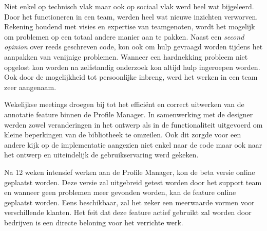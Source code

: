 Niet enkel op technisch vlak maar ook op sociaal vlak werd heel wat bijgeleerd. Door het functioneren in een team, werden heel wat nieuwe inzichten verworven. Rekening houdend met visies en expertise van teamgenoten, wordt het mogelijk om problemen op een totaal andere manier aan te pakken. Naast een \textit{second opinion} over reeds geschreven code, kon ook om hulp gevraagd worden tijdens het aanpakken van venijnige problemen. Wanneer een hardnekking probleem niet opgelost kon worden na zelfstandig onderzoek kon altijd hulp ingeroepen worden. Ook door de mogelijkheid tot persoonlijke inbreng, werd het werken in een team zeer aangenaam. 

Wekelijkse meetings droegen bij tot het effici\"{e}nt en correct uitwerken van de annotatie feature binnen de Profile Manager. In samenwerking met de designer werden zowel veranderingen in het ontwerp als in de functionaliteit uitgevoerd om kleine beperkingen van de bibliotheek te omzeilen. Ook dit zorgde voor een andere kijk op de implementatie aangezien niet enkel naar de code maar ook naar het ontwerp en uiteindelijk de gebruikservaring werd gekeken. 

Na 12 weken intensief werken aan de Profile Manager, kon de beta versie online geplaatst worden. Deze versie zal uitgebreid getest worden door het support team en wanneer geen problemen meer gevonden worden, kan de feature online geplaatst worden. Eens beschikbaar, zal het zeker een meerwaarde vormen voor verschillende klanten. Het feit dat deze feature actief gebruikt zal worden door bedrijven is een directe beloning voor het verrichte werk.  


















